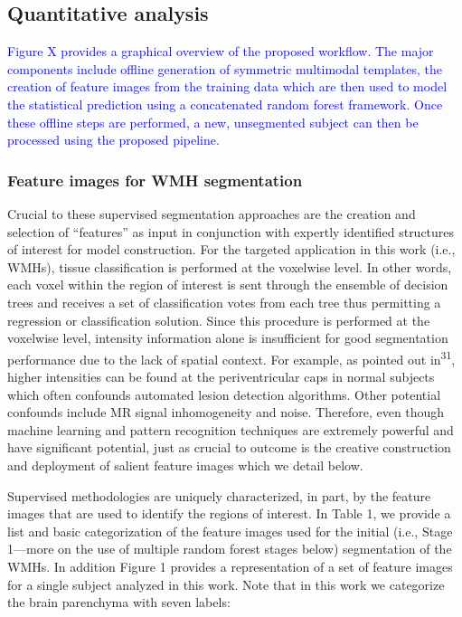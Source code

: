 \documentclass[11pt,]{article}
\begin{document}
\subsection{Quantitative analysis}\label{quantitative-analysis}

\textcolor{blue}{Figure X provides a graphical overview of the proposed workflow.  The major components
include offline generation of symmetric multimodal templates, the creation of
feature images from the training data which are then used to model the statistical
prediction using a concatenated random forest framework.  Once these offline steps
are performed, a new, unsegmented subject can then be processed using the proposed pipeline.}

\subsubsection{Feature images for WMH
segmentation}\label{feature-images-for-wmh-segmentation}

Crucial to these supervised segmentation approaches are the creation and
selection of ``features'' as input in conjunction with expertly
identified structures of interest for model construction. For the
targeted application in this work (i.e., WMHs), tissue classification is
performed at the voxelwise level. In other words, each voxel within the
region of interest is sent through the ensemble of decision trees and
receives a set of classification votes from each tree thus permitting a
regression or classification solution. Since this procedure is performed
at the voxelwise level, intensity information alone is insufficient for
good segmentation performance due to the lack of spatial context. For
example, as pointed out in\textsuperscript{31}, higher intensities can
be found at the periventricular caps in normal subjects which often
confounds automated lesion detection algorithms. Other potential
confounds include MR signal inhomogeneity and noise. Therefore, even
though machine learning and pattern recognition techniques are extremely
powerful and have significant potential, just as crucial to outcome is
the creative construction and deployment of salient feature images which
we detail below.

Supervised methodologies are uniquely characterized, in part, by the
feature images that are used to identify the regions of interest. In
Table 1, we provide a list and basic categorization of the feature
images used for the initial (i.e., Stage 1---more on the use of multiple
random forest stages below) segmentation of the WMHs. In addition Figure
1 provides a representation of a set of feature images for a single
subject analyzed in this work. Note that in this work we categorize the
brain parenchyma with seven labels:
\end{document}
